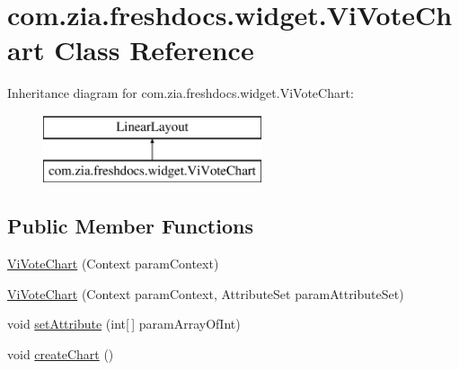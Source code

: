 \hypertarget{classcom_1_1zia_1_1freshdocs_1_1widget_1_1_vi_vote_chart}{\section{com.\-zia.\-freshdocs.\-widget.\-Vi\-Vote\-Chart Class Reference}
\label{classcom_1_1zia_1_1freshdocs_1_1widget_1_1_vi_vote_chart}
}
Inheritance diagram for com.\-zia.\-freshdocs.\-widget.\-Vi\-Vote\-Chart\-:\begin{figure}[H]
\begin{center}
\leavevmode
\includegraphics[height=2.000000cm]{classcom_1_1zia_1_1freshdocs_1_1widget_1_1_vi_vote_chart}
\end{center}
\end{figure}
\subsection*{Public Member Functions}
\begin{DoxyCompactItemize}
\item 
\hyperlink{classcom_1_1zia_1_1freshdocs_1_1widget_1_1_vi_vote_chart_a73ac3638303d4e665f526d0ce77ad861}{Vi\-Vote\-Chart} (Context param\-Context)
\item 
\hyperlink{classcom_1_1zia_1_1freshdocs_1_1widget_1_1_vi_vote_chart_a3ae60911e20d03cc6ac029e3e8c2be9c}{Vi\-Vote\-Chart} (Context param\-Context, Attribute\-Set param\-Attribute\-Set)
\item 
void \hyperlink{classcom_1_1zia_1_1freshdocs_1_1widget_1_1_vi_vote_chart_a2f1784386903466eae01859ec54d57c7}{set\-Attribute} (int\mbox{[}$\,$\mbox{]} param\-Array\-Of\-Int)
\item 
void \hyperlink{classcom_1_1zia_1_1freshdocs_1_1widget_1_1_vi_vote_chart_a946757eafae759b5fbc1c1a81db5b676}{create\-Chart} ()
\end{DoxyCompactItemize}


